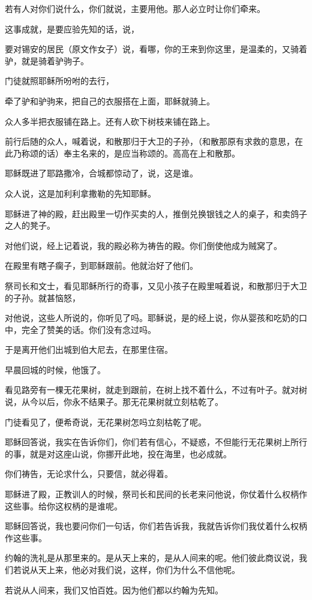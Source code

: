\documentclass[12pt,oneside]{book}
\begin{document}
若有人对你们说什么，你们就说，主要用他。那人必立时让你们牵来。

这事成就，是要应验先知的话，说，

要对锡安的居民（原文作女子）说，看哪，你的王来到你这里，是温柔的，又骑着驴，就是骑着驴驹子。

门徒就照耶稣所吩咐的去行，

牵了驴和驴驹来，把自己的衣服搭在上面，耶稣就骑上。

众人多半把衣服铺在路上。还有人砍下树枝来铺在路上。

前行后随的众人，喊着说，和散那归于大卫的子孙，（和散那原有求救的意思，在此乃称颂的话）奉主名来的，是应当称颂的。高高在上和散那。

耶稣既进了耶路撒冷，合城都惊动了，说，这是谁。

众人说，这是加利利拿撒勒的先知耶稣。

耶稣进了神的殿，赶出殿里一切作买卖的人，推倒兑换银钱之人的桌子，和卖鸽子之人的凳子。

对他们说，经上记着说，我的殿必称为祷告的殿。你们倒使他成为贼窝了。

在殿里有瞎子瘸子，到耶稣跟前。他就治好了他们。

祭司长和文士，看见耶稣所行的奇事，又见小孩子在殿里喊着说，和散那归于大卫的子孙。就甚恼怒，

对他说，这些人所说的，你听见了吗。耶稣说，是的经上说，你从婴孩和吃奶的口中，完全了赞美的话。你们没有念过吗。

于是离开他们出城到伯大尼去，在那里住宿。

早晨回城的时候，他饿了。

看见路旁有一棵无花果树，就走到跟前，在树上找不着什么，不过有叶子。就对树说，从今以后，你永不结果子。那无花果树就立刻枯乾了。

门徒看见了，便希奇说，无花果树怎吗立刻枯乾了呢。

耶稣回答说，我实在告诉你们，你们若有信心，不疑惑，不但能行无花果树上所行的事，就是对这座山说，你挪开此地，投在海里，也必成就。

你们祷告，无论求什么，只要信，就必得着。

耶稣进了殿，正教训人的时候，祭司长和民间的长老来问他说，你仗着什么权柄作这些事。给你这权柄的是谁呢。

耶稣回答说，我也要问你们一句话，你们若告诉我，我就告诉你们我仗着什么权柄作这些事。

约翰的洗礼是从那里来的。是从天上来的，是从人间来的呢。他们彼此商议说，我们若说从天上来，他必对我们说，这样，你们为什么不信他呢。

若说从人间来，我们又怕百姓。因为他们都以约翰为先知。
\end{document}
